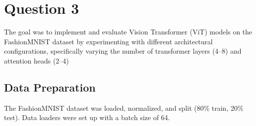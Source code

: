 \documentclass{article}
\begin{document}
\section*{Question 3}

The goal was to implement and evaluate Vision Transformer (ViT) models on the FashionMNIST dataset by experimenting with different architectural configurations, specifically varying the number of transformer layers (4–8) and attention heads (2–4)

\subsection*{Data Preparation}
The FashionMNIST dataset was loaded, normalized, and split (80\% train, 20\% test). Data loaders were set up with a batch size of 64.
\end{document}
